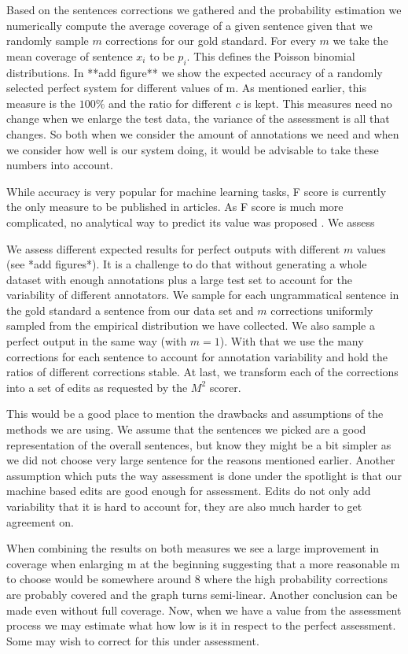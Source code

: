 \documentclass[english]{article}
\begin{document}
Based on the sentences corrections we gathered and the probability estimation we numerically compute the average coverage of a given sentence given that we randomly sample $m$ corrections for our gold standard. For every $m$ we take the mean coverage of sentence $x_i$ to be $p_i$. This defines the Poisson binomial distributions. In {*}{*}add figure{*}{*} we show the expected accuracy of a randomly selected perfect system for different values of m. As mentioned earlier, this measure is the $100\%$ and the ratio for different $c$ is kept. This measures need no change when we enlarge the test data, the variance of the assessment is all that changes. So both when we consider the amount of annotations we need and when we consider how well is our system doing, it would be advisable to take these numbers into account.

While accuracy is very popular for machine learning tasks, F score is currently the only measure to be published in articles. As F score is much more complicated, no analytical way to predict its value was proposed \cite{yeh2000more}. We assess 

We assess different expected results for perfect outputs with different $m$ values (see {*}add figures{*}). It is a challenge to do that without generating a whole dataset with enough annotations plus a large test set to account for the variability of different annotators. We sample for each ungrammatical sentence in the gold standard a sentence from our data set and $m$ corrections uniformly sampled from the empirical distribution we have collected. We also sample a perfect output in the same way (with $m=1$). With that we use the many corrections for each sentence to account for annotation variability and hold the ratios of different corrections stable. At last, we transform each of the corrections into a set of edits as requested by the $M^2$ scorer\cite{dahlmeier2012better}.  

This would be a good place to mention the drawbacks and assumptions of the methods we are using. We assume that the sentences we picked are a good representation of the overall sentences, but know they might be a bit simpler as we did not choose very large sentence for the reasons mentioned earlier. Another assumption which puts the way assessment is done under the spotlight is that our machine based edits are good enough for assessment. Edits do not only add variability that it is hard to account for, they are also much harder to get agreement on. 

When combining the results on both measures we see a large improvement in coverage when enlarging m at the beginning suggesting that a more reasonable m to choose would be somewhere around 8 where the high probability corrections are probably covered and the graph turns semi-linear.
 Another conclusion can be made even without full coverage. Now, when we have a value from the assessment process we may estimate what how low is it in respect to the perfect assessment. Some may wish to correct for this under assessment.
\end{document}

